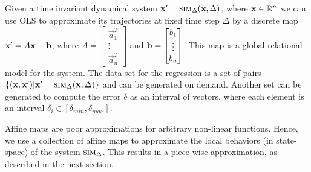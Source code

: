 Given a time invariant dynamical system $\mathbf{x}' = \mbox{\sc sim}_\Delta(\mathbf{x}, \Delta)$,
where $\mathbf{x}\in\mathbb{R}^n$ we can use OLS to approximate its trajectories
at fixed time step $\Delta$ by a discrete map $\mathbf{x}' = A\mathbf{x} + \mathbf{b}$, where
$A = \begin{bmatrix}\vec{a}_1^T \\ \vdots \\ \vec{a}_n^T \end{bmatrix}$ and $\mathbf{b} =
\begin{bmatrix}b_1 \\ \vdots \\ b_n \end{bmatrix}$. This map is a
    global relational model for the system. The data set for the
    regression is a set of pairs $\{(\mathbf{x},\mathbf{x}') | \mathbf{x}' =
    \mbox{\sc sim}_\Delta(\mathbf{x}, \Delta)\}$ and can be generated on demand. Another
    set can be generated to compute the error $\delta$ as an interval
    of vectors, where each element is an interval $\delta_i \in
    [\delta_{min}, \delta_{max}]$.

    Affine maps are poor
    approximations for arbitrary non-linear functions. Hence, we use a
    collection of affine maps to approximate the local behaviors (in
    state-space) of the system $\mbox{\sc sim}_\Delta$. This results in a piece
    wise approximation, as described in the next section.





